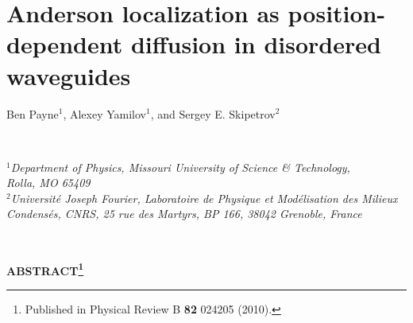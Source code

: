 % 
% 
% 
% 

\chapter{Anderson localization as position-dependent diffusion in disordered waveguides}
\label{chap:Dz_absorb}
\label{paper:4_start}

\begin{center}
Ben Payne$^1$, Alexey Yamilov$^1$, and Sergey E. Skipetrov$^2$
\end{center}

\ \\
\begin{center}
\textit{$^1$Department of Physics, Missouri University of Science \& Technology,\\ Rolla, MO 65409\\
$^2$Universit\'{e} Joseph Fourier, Laboratoire de Physique et Mod\'{e}lisation des Milieux Condens\'{e}s, CNRS, 25 rue des Martyrs, BP 166, 38042 Grenoble, France}\end{center}

\ \\
% 
% 
\begin{center}\textbf{ABSTRACT\footnote{Published in Physical Review B \textbf{82} 024205 (2010).}}        \end{center}

